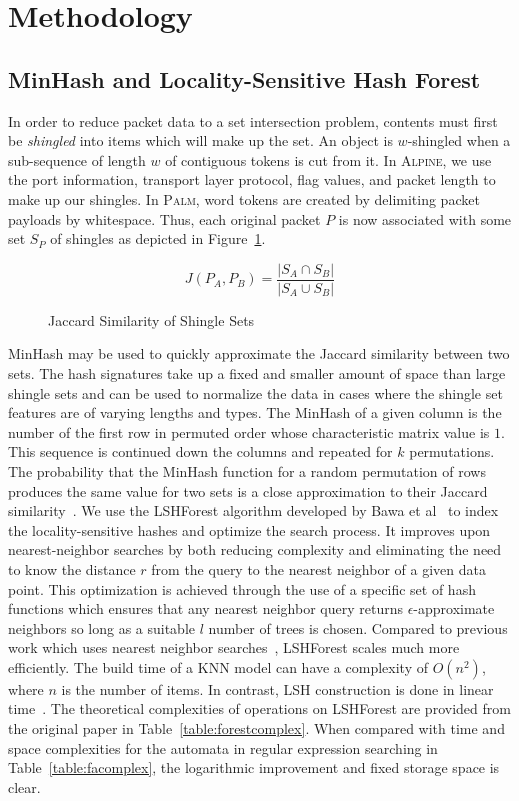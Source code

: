 \section{Methodology}

\subsection{MinHash and Locality-Sensitive Hash Forest}

In order to reduce packet data to a set intersection problem, contents must first be \textit{shingled} into items which will make up the set. An object is $w$-shingled when a sub-sequence of length $w$ of contiguous tokens is cut from it. In \textsc{Alpine}, we use the port information, transport layer protocol, flag values, and packet length to make up our shingles. In \textsc{Palm}, word tokens are created by delimiting packet payloads by whitespace. Thus, each original packet $P$ is now associated with some set $S_P$ of shingles as depicted in Figure~\ref{jacsim}.

\begin{figure} [ht!]
\begin{equation}
J(P_A, P_B) = \frac{|S_A \cap S_B|}{|S_A \cup S_B|}
\end{equation}
\caption{Jaccard Similarity of Shingle Sets}
\label{jacsim}
\end{figure}

MinHash may be used to quickly approximate the Jaccard similarity between two sets. The hash signatures take up a fixed and smaller amount of space than large shingle sets and can be used to normalize the data in cases where the shingle set features are of varying lengths and types. The MinHash of a given column is the number of the first row in permuted order whose characteristic matrix value is $1$. This sequence is continued down the columns and repeated for $k$ permutations. The probability that the MinHash function for a random permutation of rows produces the same value for two sets is a close approximation to their Jaccard similarity~\cite{mmds}. We use the LSHForest algorithm developed by Bawa et al~\cite{lshforest} to index the locality-sensitive hashes and optimize the search process. It improves upon nearest-neighbor searches by both reducing complexity and eliminating the need to know the distance $r$ from the query to the nearest neighbor of a given data point. This optimization is achieved through the use of a specific set of hash functions which ensures that any nearest neighbor query returns $\epsilon$-approximate neighbors so long as a suitable $l$ number of trees is chosen. Compared to previous work which uses nearest neighbor searches~\cite{fpga}, LSHForest scales much more efficiently. The build time of a KNN model can have a complexity of $O(n^2)$, where $n$ is the number of items. In contrast, LSH construction is done in linear time~\cite{lshforest}. The theoretical complexities of operations on LSHForest are provided from the original paper in Table~\ref{table:forestcomplex}. When compared with time and space complexities for the automata in regular expression searching in Table~\ref{table:facomplex}, the logarithmic improvement and fixed storage space is clear.

